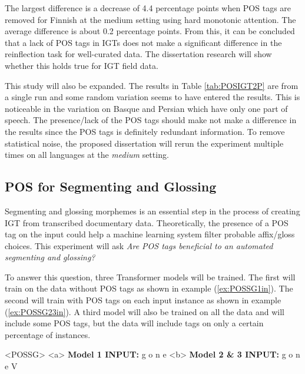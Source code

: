  
The largest difference is a decrease of 4.4 percentage points when POS tags are removed for Finnish at the medium setting using hard monotonic attention. 
The average difference is about 0.2 percentage points.
From this, it can be concluded that a lack of POS tags in IGTs does not make a significant difference in the reinflection task for well-curated data. The dissertation research will show whether this holds true for IGT field data. 

This study will also be expanded. The results in Table \ref{tab:POSIGT2P} are from a single run and some random variation seems to have entered the results. This is noticeable in the variation on Basque and Persian which have only one part of speech. The presence/lack of the POS tags should make not make a difference in the results since the POS tags is definitely redundant information. To remove statistical noise, the proposed dissertation will rerun the experiment multiple times on all languages at the \textit{medium} setting.


\subsection{POS for Segmenting and Glossing}

Segmenting and glossing morphemes is an essential step in the process of creating IGT from transcribed documentary data. Theoretically, the presence of a POS tag on the input could help a machine learning system filter probable affix/gloss choices. This experiment will ask \textit{Are POS tags beneficial to an automated segmenting and glossing?} 

To answer this question, three Transformer models will be trained. The first will train on the data without POS tags as shown in example (\ref{ex:POSSG1in}). The second will train with POS tags on each input instance as shown in example (\ref{ex:POSSG23in}). A third model will also be trained on all the data and will include some POS tags, but the data will include tags on only a certain percentage of instances. 

\begin{singlespace}
\pex<POSSG>   
\label{ex:POSSG}
\a<a> \textbf{Model 1 INPUT:} \hspace{6 mm} g \hspace{2 mm} o \hspace{2 mm} n \hspace{2 mm} e 
\label{ex:POSSG1in}
\a<b> \textbf{Model 2 \& 3 INPUT:} \hspace{6 mm} g \hspace{2 mm} o \hspace{2 mm} n \hspace{2 mm} e \hspace{2 mm} V
\label{ex:POSSG23in}
\xe
\end{singlespace}

